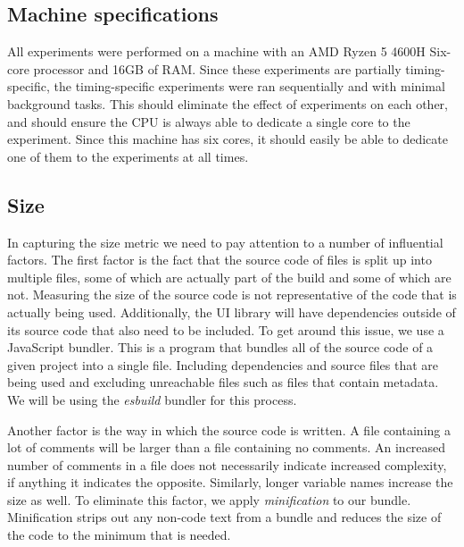 \subsection{Machine specifications}
All experiments were performed on a machine with an AMD Ryzen 5 4600H Six-core processor and 16GB of RAM. Since these experiments are partially timing-specific, the timing-specific experiments were ran sequentially and with minimal background tasks. This should eliminate the effect of experiments on each other, and should ensure the CPU is always able to dedicate a single core to the experiment. Since this machine has six cores, it should easily be able to dedicate one of them to the experiments at all times.

\subsection{Size}\label{sec:experimental-setup:size}
In capturing the size metric we need to pay attention to a number of influential factors. The first factor is the fact that the source code of files is split up into multiple files, some of which are actually part of the build and some of which are not. Measuring the size of the source code is not representative of the code that is actually being used. Additionally, the UI library will have dependencies outside of its source code that also need to be included. To get around this issue, we use a JavaScript bundler. This is a program that bundles all of the source code of a given project into a single file. Including dependencies and source files that are being used and excluding unreachable files such as files that contain metadata. We will be using the \emph{esbuild} bundler for this process.

Another factor is the way in which the source code is written. A file containing a lot of comments will be larger than a file containing no comments. An increased number of comments in a file does not necessarily indicate increased complexity, if anything it indicates the opposite. Similarly, longer variable names increase the size as well. To eliminate this factor, we apply \emph{minification} to our bundle. Minification strips out any non-code text from a bundle and reduces the size of the code to the minimum that is needed.

